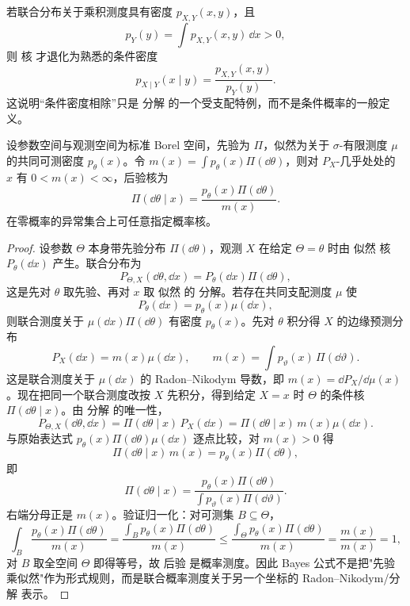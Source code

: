 若联合分布关于乘积测度具有密度 $p_{X,Y}(x,y)$，且
\[
p_Y(y)=\int p_{X,Y}(x,y)\,\dd x>0,
\]
则 核 才退化为熟悉的条件密度
\begin{equation*}p_{X\mid Y}(x\mid y)
=\frac{p_{X,Y}(x,y)}{p_Y(y)}.\end{equation*}
这说明“条件密度相除”只是 分解 的一个受支配特例，而不是条件概率的一般定义。

\begin{proposition}
设参数空间与观测空间为标准 Borel 空间，先验为 $\Pi$，似然为关于 $\sigma$-有限测度 $\mu$ 的共同可测密度 $p_\theta(x)$。令 $m(x)=\int p_\theta(x)\Pi(\dd\theta)$，则对 $P_X$-几乎处处的 $x$ 有 $0<m(x)<\infty$，后验核为
\[
\Pi(\dd\theta\mid x)=\frac{p_\theta(x)\Pi(\dd\theta)}{m(x)}.
\]
在零概率的异常集合上可任意指定概率核。
\end{proposition}
\begin{proof}
设参数 $\Theta$ 本身带先验分布 $\Pi(\dd\theta)$，观测 $X$ 在给定 $\Theta=\theta$ 时由 似然 核 $P_\theta(\dd x)$ 产生。联合分布为
\[
P_{\Theta,X}(\dd\theta,\dd x)
=P_\theta(\dd x)\Pi(\dd\theta),
\]
这是先对 $\theta$ 取先验、再对 $x$ 取 似然 的 分解。若存在共同支配测度 $\mu$ 使
\[
P_\theta(\dd x)=p_\theta(x)\mu(\dd x),
\]
则联合测度关于 $\mu(\dd x)\Pi(\dd\theta)$ 有密度 $p_\theta(x)$。先对 $\theta$ 积分得 $X$ 的边缘预测分布
\[
P_X(\dd x)=m(x)\mu(\dd x),
\qquad
m(x)=\int p_\vartheta(x)\,\Pi(\dd\vartheta).
\]
这是联合测度关于 $\mu(\dd x)$ 的 Radon--Nikodym 导数，即 $m(x)=\dd P_X/\dd\mu(x)$。现在把同一个联合测度改按 $X$ 先积分，得到给定 $X=x$ 时 $\Theta$ 的条件核 $\Pi(\dd\theta\mid x)$。由 分解 的唯一性，
\[
P_{\Theta,X}(\dd\theta,\dd x)
=\Pi(\dd\theta\mid x)\,P_X(\dd x)
=\Pi(\dd\theta\mid x)\,m(x)\mu(\dd x).
\]
与原始表达式 $p_\theta(x)\Pi(\dd\theta)\mu(\dd x)$ 逐点比较，对 $m(x)>0$ 得
\[
\Pi(\dd\theta\mid x)\,m(x)=p_\theta(x)\Pi(\dd\theta),
\]
即
\begin{equation}
\boxed{
\Pi(\dd\theta\mid x)
=\frac{p_\theta(x)\Pi(\dd\theta)}
{\int p_\vartheta(x)\Pi(\dd\vartheta)}.
}
\label{eq:math-stat-bayes-kernel}
\end{equation}
右端分母正是 $m(x)$。验证归一化：对可测集 $B\subseteq\Theta$，
\[
\int_B\frac{p_\theta(x)\Pi(\dd\theta)}{m(x)}
=\frac{\int_B p_\theta(x)\Pi(\dd\theta)}{m(x)}
\le\frac{\int_\Theta p_\theta(x)\Pi(\dd\theta)}{m(x)}
=\frac{m(x)}{m(x)}=1,
\]
对 $B$ 取全空间 $\Theta$ 即得等号，故 后验 是概率测度。因此 Bayes 公式不是把"先验乘似然"作为形式规则，而是联合概率测度关于另一个坐标的 Radon--Nikodym/分解 表示。
\end{proof}


